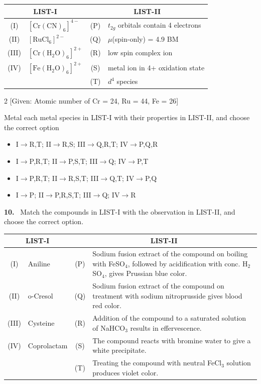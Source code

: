 \documentclass[10pt]{extarticle}
\newcommand{\qn}[1]{\par\smallskip\noindent\textbf{#1.}~}
\newenvironment{qoptions}{\begin{itemize}[leftmargin=1.8em,itemsep=1pt,topsep=2pt,label={}]}{\end{itemize}}
\newcommand{\opt}[2]{\item[(#1)] #2}
\begin{document}
\begin{center}
\begin{tabular}{|c|l|c|l|}
\hline
\multicolumn{2}{|c|}{LIST-I} & \multicolumn{2}{c|}{LIST-II} \\
\hline
(I) & $[\mathrm{Cr(CN)_6}]^{4-}$ & (P) & $t_{2g}$ orbitals contain 4 electrons \\
\hline
(II) & $[\mathrm{RuCl_6}]^{2-}$ & (Q) & $\mu$(spin-only) = 4.9 BM \\
\hline
(III) & $[\mathrm{Cr(H_2O)_6}]^{2+}$ & (R) & low spin complex ion \\
\hline
(IV) & $[\mathrm{Fe(H_2O)_6}]^{2+}$ & (S) & metal ion in 4+ oxidation state \\
\hline
& & (T) & $d^4$ species \\
\hline
\end{tabular}
\end{center}
\begin{multicols}{2}
[Given: Atomic number of Cr = 24, Ru = 44, Fe = 26]\par
Metal each metal species in LIST-I with their properties in LIST-II, and choose the correct option
\begin{qoptions}
\opt{A}{I$\to$R,T; II$\to$R,S; III$\to$Q,R,T; IV$\to$P,Q,R}
\opt{B}{I$\to$P,R,T; II$\to$P,S,T; III$\to$Q; IV$\to$P,T}
\opt{C}{I$\to$P,R,T; II$\to$R,S,T; III$\to$Q,T; IV$\to$P,Q}
\opt{D}{I$\to$P; II$\to$P,R,S,T; III$\to$Q; IV$\to$R}
\end{qoptions}

\qn{10} Match the compounds in LIST-I with the observation in LIST-II, and choose the correct option.
\end{multicols}
\begin{center}
\begin{tabular}{|c|l|c|p{6cm}|}
\hline
\multicolumn{2}{|c|}{LIST-I} & \multicolumn{2}{c|}{LIST-II} \\
\hline
(I) & Aniline & (P) & Sodium fusion extract of the compound on boiling with FeSO$_4$, followed by acidification with conc. H$_2$SO$_4$, gives Prussian blue color. \\
\hline
(II) & o-Cresol & (Q) & Sodium fusion extract of the compound on treatment with sodium nitroprusside gives blood red color. \\
\hline
(III) & Cysteine & (R) & Addition of the compound to a saturated solution of NaHCO$_3$ results in effervescence. \\
\hline
(IV) & Coprolactam & (S) & The compound reacts with bromine water to give a white precipitate. \\
\hline
& & (T) & Treating the compound with neutral FeCl$_3$ solution produces violet color. \\
\hline
\end{tabular}
\end{center}
\end{document}
